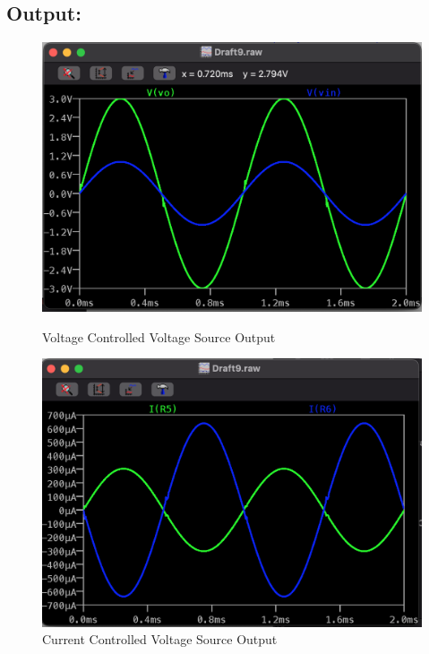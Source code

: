\documentclass[a4paper,12pt]{report}
\begin{document}
  \subsection{Output:} 
    \begin{figure}[h]
        \centering
        \begin{minipage}{0.45\textwidth}
            \centering
            \includegraphics[width=\linewidth]{../Img/E5OpVCVS}
            \caption{Voltage Controlled Voltage Source Output}
        \end{minipage}
        \hfill
        \begin{minipage}{0.45\textwidth}
            \centering
            \includegraphics[width=\linewidth]{../Img/E5OpCCVS}
            \caption{Current Controlled Voltage Source Output}
        \end{minipage}
        

\end{figure}
\end{document}
